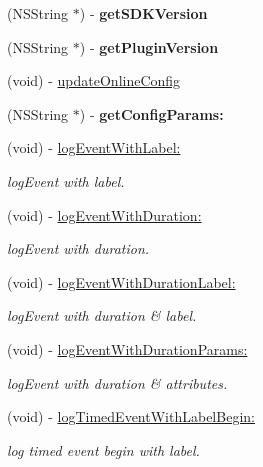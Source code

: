 \begin{DoxyCompactItemize}
\mbox{\label{interfaceAnalyticsUmeng_a1f3fa1ff232259251f2b11a943668fe1}} 
(N\+S\+String $\ast$) -\/ {\bfseries get\+S\+D\+K\+Version}
\item 
\mbox{\label{interfaceAnalyticsUmeng_ae265d0a9cb1e3ccd404c6bc16e6a6d75}} 
(N\+S\+String $\ast$) -\/ {\bfseries get\+Plugin\+Version}
\item 
(void) -\/ \hyperlink{interfaceAnalyticsUmeng_a7d2aef9bd4a68f9e08333f047e98b9fd}{update\+Online\+Config}
\item 
\mbox{\label{interfaceAnalyticsUmeng_a18b478160678ca39c273eea985914cd1}} 
(N\+S\+String $\ast$) -\/ {\bfseries get\+Config\+Params\+:}
\item 
(void) -\/ \hyperlink{interfaceAnalyticsUmeng_a5b8db94d1204380c03576d2ba482a62a}{log\+Event\+With\+Label\+:}
\begin{DoxyCompactList}\small\item\em log\+Event with label. \end{DoxyCompactList}\item 
(void) -\/ \hyperlink{interfaceAnalyticsUmeng_a3e37a1fded47b9dc95bf9d802803a43a}{log\+Event\+With\+Duration\+:}
\begin{DoxyCompactList}\small\item\em log\+Event with duration. \end{DoxyCompactList}\item 
(void) -\/ \hyperlink{interfaceAnalyticsUmeng_a93bba736f6e9d2a69101ed2f04371cc6}{log\+Event\+With\+Duration\+Label\+:}
\begin{DoxyCompactList}\small\item\em log\+Event with duration \& label. \end{DoxyCompactList}\item 
(void) -\/ \hyperlink{interfaceAnalyticsUmeng_ac3014fae8294c7ae2efdffecd13abdd3}{log\+Event\+With\+Duration\+Params\+:}
\begin{DoxyCompactList}\small\item\em log\+Event with duration \& attributes. \end{DoxyCompactList}\item 
(void) -\/ \hyperlink{interfaceAnalyticsUmeng_a21b066fcb09e160ffb7bb93be5fd85bc}{log\+Timed\+Event\+With\+Label\+Begin\+:}
\begin{DoxyCompactList}\small\item\em log timed event begin with label. \end{DoxyCompactList}\item 

\end{DoxyCompactItemize}
